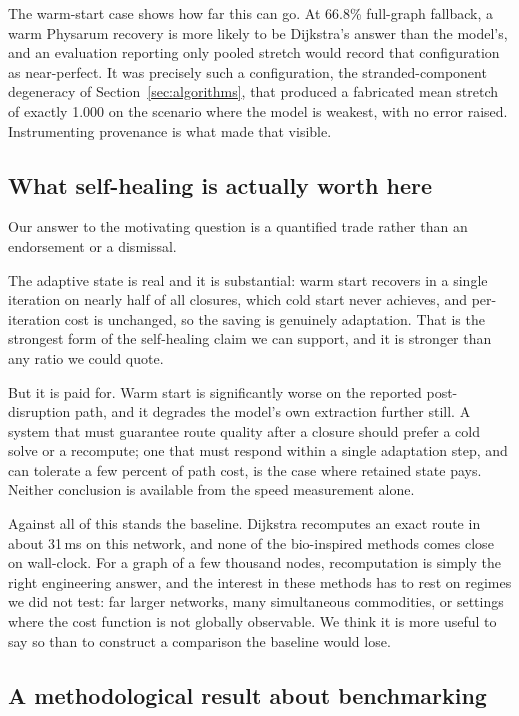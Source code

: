 The warm-start case shows how far this can go. At 66.8\% full-graph fallback,
a warm Physarum recovery is more likely to be Dijkstra's answer than the
model's, and an evaluation reporting only pooled stretch would record that
configuration as near-perfect. It was precisely such a configuration, the stranded-component degeneracy of
Section~\ref{sec:algorithms}, that produced a fabricated mean stretch of exactly 1.000 on the scenario where
the model is weakest, with no error raised. Instrumenting provenance is what
made that visible.

\subsection{What self-healing is actually worth here}

Our answer to the motivating question is a quantified trade rather than an
endorsement or a dismissal.

The adaptive state is real and it is substantial: warm start recovers in a
single iteration on nearly half of all closures, which cold start never
achieves, and per-iteration cost is unchanged, so the saving is genuinely
adaptation. That is the strongest form of the self-healing claim we can
support, and it is stronger than any ratio we could quote.

But it is paid for. Warm start is significantly worse on the reported
post-disruption path, and it degrades the model's own extraction further
still. A system that must guarantee route quality after a closure should
prefer a cold solve or a recompute; one that must respond within a single
adaptation step, and can tolerate a few percent of path cost, is the case
where retained state pays. Neither conclusion is available from the speed
measurement alone.

Against all of this stands the baseline. Dijkstra recomputes an exact route
in about 31\,ms on this network, and none of the bio-inspired methods comes
close on wall-clock. For a graph of a few thousand nodes, recomputation is
simply the right engineering answer, and the interest in these methods has to
rest on regimes we did not test: far larger networks, many simultaneous
commodities, or settings where the cost function is not globally observable.
We think it is more useful to say so than to construct a comparison the
baseline would lose.

\subsection{A methodological result about benchmarking}

